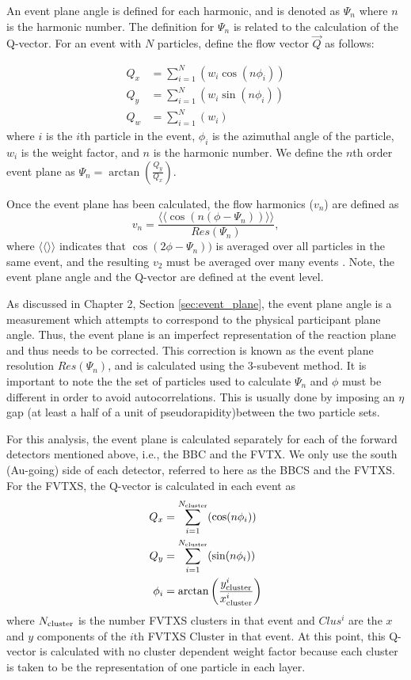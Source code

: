 An event plane angle is defined for each harmonic, and is denoted as $\Psi_n$ where $n$ is the harmonic number. The definition for $\Psi_n$ is related to the calculation of the Q-vector. For an event with $N$ particles, define the flow vector $\vec{Q}$ as follows:

\begin{align}
Q_x &= \sum_{i=1}^{N}( w_i \cos(n \phi_i)) \\
Q_y &= \sum_{i=1}^{N}( w_i \sin(n \phi_i)) \\
Q_w &= \sum_{i=1}^{N}( w_i )
\label{eqn:general_ep_math}
\end{align}
where $i$ is the $i$th particle in the event, $\phi_i$ is the azimuthal angle of the particle, $w_i$ is the weight factor, and $n$ is the harmonic number. We define the $n$th order event plane as
$\Psi_n = \arctan \left( \frac{Q_y}{Q_x} \right). $

Once the event plane has been calculated, the flow harmonics ($v_n$) are defined as
\begin{equation}
v_n = \frac{\langle \langle\cos(n(\phi - \Psi_n))\rangle \rangle}{Res(\Psi_n)},
\end{equation}
where $\langle \langle \rangle \rangle$ indicates that $\cos(2\phi-\Psi_n))$ is averaged over all particles in the same event, and the resulting $v_2$ must be averaged over many events \cite{PhysRevC.58.1671}. Note, the event plane angle and the Q-vector are defined at the event level.
  
As discussed in Chapter 2, Section \ref{sec:event_plane}, the event plane angle is a measurement which attempts to correspond to the physical participant plane angle. Thus, the event plane is an imperfect representation of the reaction plane and thus needs to be corrected. This correction is known as the event plane resolution $Res(\Psi_n)$, and is calculated using the 3-subevent method. It is important to note the the set of particles used to calculate $\Psi_n$ and $\phi$ must be different in order to avoid autocorrelations. This is usually done by imposing an $\eta$ gap (at least a half of a unit of pseudorapidity)between the two particle sets.

For this analysis, the event plane is calculated separately for each of the forward detectors mentioned above, i.e., the BBC and the FVTX. We only use the south (Au-going) side of each detector, referred to here as the BBCS and the FVTXS.
For the FVTXS, the Q-vector is calculated in each event as
\begin{align}
Q_x &= \sum^{N_{\rm cluster}}_{i=1}( \cos(n\phi_i)) \\
Q_y &= \sum^{N_{\rm cluster}}_{i=1}( \sin(n\phi_i)) \\
\phi_i &= \arctan\left(\frac{y^i_{\rm cluster}}{x^i_{\rm cluster}}\right)
\end{align}
where $N_{\rm cluster}$ is the number FVTXS clusters in that event and $Clus^i$ are the $x$ and $y$ components of the $i$th FVTXS Cluster in that event. At this point, this Q-vector is calculated with no cluster dependent weight factor because each cluster is taken to be the representation of one particle in each layer.

